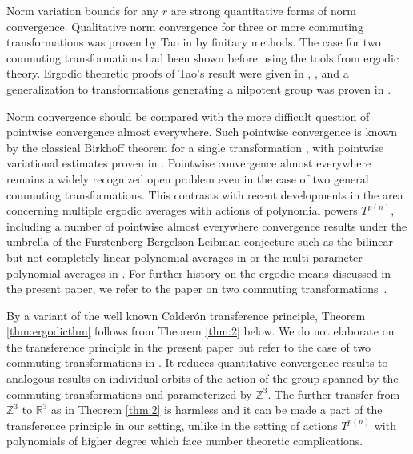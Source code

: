 \documentclass[12pt,reqno]{amsart}
\theoremstyle{plain}
\theoremstyle{definition}
\numberwithin{equation}{section}
\begin{document}
Norm variation bounds for any $r$ are strong quantitative forms of norm convergence. 
Qualitative norm convergence for 
three or more commuting transformations was proven by Tao in \cite{MR2408398} by finitary methods.
The case for two commuting transformations had been shown before using the tools from ergodic theory. Ergodic theoretic proofs of Tao's result were given in \cite{MR2599882}, \cite{MR2539560}, and a generalization 
to transformations generating a nilpotent group was proven in \cite{MR2912715}.

Norm convergence should be compared with the more difficult question
of pointwise convergence almost everywhere. Such pointwise
convergence is known by the classical Birkhoff theorem for
a single transformation \cite{bir30}, with pointwise variational estimates proven in \cite{MR1019960}.
Pointwise convergence almost everywhere remains a widely recognized open problem even in the case of two general commuting transformations.
This contrasts with recent developments  in the area concerning multiple ergodic averages with actions 
of polynomial powers $T^{p(n)}$, including a number
of pointwise almost everywhere convergence results 
under the umbrella of the Furstenberg-Bergelson-Leibman conjecture such as the bilinear but
not completely linear polynomial averages in \cite{MR4413747} or
the multi-parameter polynomial averages in \cite{BMSW22}. 
For further history on the ergodic means discussed in the present paper, we refer to the paper on two commuting transformations~\cite{MR3904183}.






By a variant of the well known Calder{\'o}n transference principle,  
 Theorem \ref{thm:ergodicthm} follows from 
Theorem \ref{thm:2} below. We do not elaborate on the transference principle in the present paper but refer to
the case of two commuting transformations  in \cite{MR3904183}. It reduces quantitative convergence results to
analogous results on individual orbits of the action of the group  spanned by the commuting transformations
and parameterized by $\mathbb{Z}^3$.
The further transfer from
$\mathbb{Z}^3$ to $\mathbb{R}^3$ as in Theorem
\ref{thm:2} is harmless and it can be made a part of the transference principle in our setting, unlike in the setting of actions $T^{p(n)}$
with polynomials of higher degree which face number theoretic complications.
\end{document}
